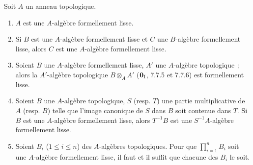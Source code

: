\begin{proposition}[19.3.5]
\label{0.19.3.5-fr}
Soit $A$ un anneau topologique.
\begin{enumerate}
  \item[\textup{(i)}] $A$ est une $A$-algèbre formellement lisse.
  \item[\textup{(ii)}] Si $B$ est une $A$-algèbre formellement lisse et $C$ une
  $B$-algèbre formellement lisse, alors $C$ est une $A$-algèbre formellement
  lisse.
  \item[\textup{(iii)}] Soient $B$ une $A$-algèbre formellement lisse, $A'$ une
  $A$-algèbre topologique~; alors la $A'$-algèbre topologique
  $B\otimes_A A'$ \textup{($\mathbf 0_{\rm I}$, 7.7.5 et 7.7.6)} est formellement
  lisse.
  \item[\textup{(iv)}] Soient $B$ une $A$-algèbre topologique, $S$ \textup{(resp. $T$)} une
  partie multiplicative de $A$ \textup{(resp. $B$)} telle que l'image canonique de $S$
  dans $B$ soit contenue dans $T$. Si $B$ est une $A$-algèbre formellement
  lisse, alors $T^{-1}B$ est une $S^{-1}A$-algèbre formellement lisse.
  \item[\textup{(v)}] Soient $B_i$ \textup{($1\leq i\leq n$)} des $A$-algèbres topologiques.
  Pour que $\prod_{i=1}^n B_i$ soit une $A$-algèbre formellement lisse, il
  faut et il suffit que chacune des $B_i$ le soit.
\end{enumerate}
\end{proposition}

